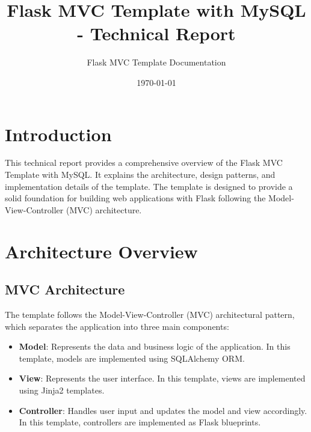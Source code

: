 \documentclass{article}
\title{Flask MVC Template with MySQL - Technical Report}
\author{Flask MVC Template Documentation}
\date{\today}
\begin{document}
\maketitle

\tableofcontents
\newpage

\section{Introduction}

This technical report provides a comprehensive overview of the Flask MVC Template with MySQL. It explains the architecture, design patterns, and implementation details of the template. The template is designed to provide a solid foundation for building web applications with Flask following the Model-View-Controller (MVC) architecture.

\section{Architecture Overview}

\subsection{MVC Architecture}

The template follows the Model-View-Controller (MVC) architectural pattern, which separates the application into three main components:

\begin{itemize}
    \item \textbf{Model}: Represents the data and business logic of the application. In this template, models are implemented using SQLAlchemy ORM.
    \item \textbf{View}: Represents the user interface. In this template, views are implemented using Jinja2 templates.
    \item \textbf{Controller}: Handles user input and updates the model and view accordingly. In this template, controllers are implemented as Flask blueprints.
\end{itemize}

\end{document}
